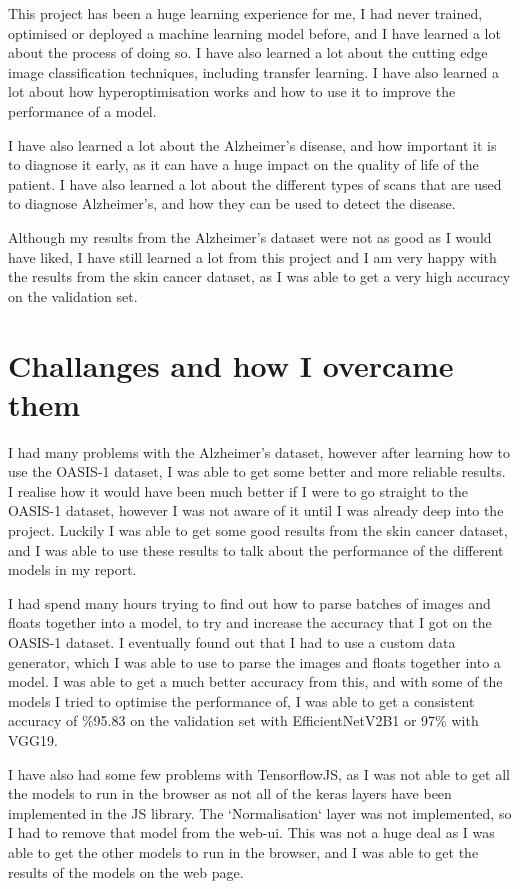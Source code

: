 \documentclass[]{final_report}
\begin{document}
This project has been a huge learning experience for me, I had never trained, optimised or deployed a machine learning model before, and I have learned a lot about the process of doing so. I have also learned a lot about the cutting edge image classification techniques, including transfer learning. I have also learned a lot about how hyperoptimisation works and how to use it to improve the performance of a model.

I have also learned a lot about the Alzheimer's disease, and how important it is to diagnose it early, as it can have a huge impact on the quality of life of the patient. I have also learned a lot about the different types of scans that are used to diagnose Alzheimer's, and how they can be used to detect the disease. 

Although my results from the Alzheimer's dataset were not as good as I would have liked, I have still learned a lot from this project and I am very happy with the results from the skin cancer dataset, as I was able to get a very high accuracy on the validation set.

\section{Challanges and how I overcame them}

I had many problems with the Alzheimer's dataset, however after learning how to use the OASIS-1 dataset, I was able to get some better and more reliable results. I realise how it would have been much better if I were to go straight to the OASIS-1 dataset, however I was not aware of it until I was already deep into the project. Luckily I was able to get some good results from the skin cancer dataset, and I was able to use these results to talk about the performance of the different models in my report.

I had spend many hours trying to find out how to parse batches of images and floats together into a model, to try and increase the accuracy that I got on the OASIS-1 dataset. I eventually found out that I had to use a custom data generator, which I was able to use to parse the images and floats together into a model. I was able to get a much better accuracy from this, and with some of the models I tried to optimise the performance of, I was able to get a consistent accuracy of \%95.83 on the validation set with EfficientNetV2B1 or 97\% with VGG19.

I have also had some few problems with TensorflowJS\cite{smilkov2019tensorflowjs}, as I was not able to get all the models to run in the browser as not all of the keras layers have been implemented in the JS library. The `Normalisation` layer was not implemented, so I had to remove that model from the web-ui. This was not a huge deal as I was able to get the other models to run in the browser, and I was able to get the results of the models on the web page.
\end{document}
